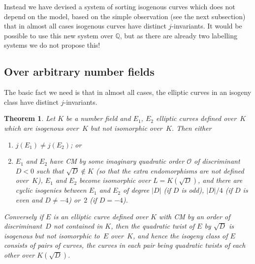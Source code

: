 \documentclass{article}
\newtheorem{thm}{Theorem}[section]
\def\Q{{\mathbb Q}}
\def\OO{{\mathcal O}}
\begin{document}
Instead we have devised a system of sorting isogenous curves which
does not depend on the model, based on the simple observation (see the
next subsection) that in almost all cases isogenous curves have
distinct $j$-invariants.  It would be possible to use this new system
over $\Q$, but as there are already two labelling systems we do not
propose this!

\subsection{Over arbitrary number fields}

The basic fact we need is that in almost all cases, the elliptic
curves in an isogeny class have distinct $j$-invariants.

\begin{thm}
Let $K$ be a number field and $E_1$, $E_2$ elliptic curves defined
over~$K$ which are isogenous over~$K$ but not isomorphic over~$K$.
Then either
\begin{enumerate}
\item $j(E_1)\not=j(E_2)$; or
\item $E_1$ and $E_2$ have CM by some imaginary quadratic order $\OO$
  of discriminant~$D<0$ such that $\sqrt{D}\notin K$ (so that the extra
  endomorphisms are not defined over~$K$), $E_1$ and $E_2$ become
  isomorphic over $L=K(\sqrt{D})$, and there are cyclic isogenies
  between $E_1$ and $E_2$ of degree $|D|$ (if $D$ is odd), $|D|/4$
  (if $D$ is even and $D\not=-4$) or~$2$ (if $D=-4$).
\end{enumerate}
Conversely if $E$ is an elliptic curve defined over $K$ with CM by an
order of discriminant~$D$ not contained in $K$, then the quadratic
twist of $E$ by $\sqrt{D}$ is isogenous but not isomorphic to~$E$
over~$K$, and hence the isogeny class of $E$ consists of pairs of
curves, the curves in each pair being quadratic twists of each other
over $K(\sqrt{D})$.
\end{thm}
\end{document}
